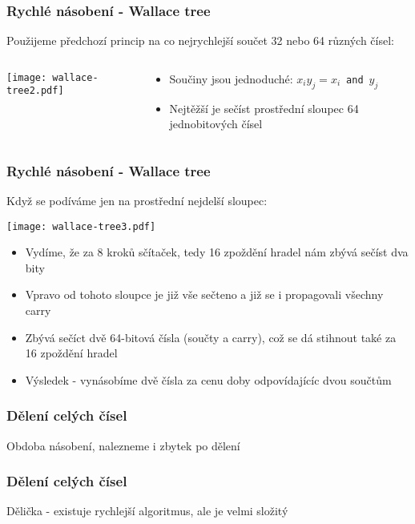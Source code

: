 \documentclass{beamer}
\begin{document}
\begin{frame}
\frametitle{Rychlé násobení - Wallace tree}

Použijeme předchozí princip na co nejrychlejší součet 32 nebo 64 různých čísel:
\begin{columns}
\begin{column}{0.6\textwidth}
\texttt{[image: wallace-tree2.pdf]}
\end{column}
\hfill
\begin{column}{0.4\textwidth}
\begin{itemize}
\item Součiny jsou jednoduché: $x_iy_j=x_i$~\texttt{and}~$y_j$
\item Nejtěžší je sečíst prostřední sloupec 64 jednobitových čísel
\end{itemize}
\end{column}
\end{columns}

\end{frame}

\begin{frame}[shrink=5]
\frametitle{Rychlé násobení - Wallace tree}

Když se podíváme jen na prostřední nejdelší sloupec:
\begin{center}
\texttt{[image: wallace-tree3.pdf]}
\end{center}

\begin{itemize}
\item Vydíme, že za 8 kroků sčítaček, tedy 16 zpoždění hradel nám zbývá sečíst dva bity
\item Vpravo od tohoto sloupce je již vše sečteno a již se i propagovali všechny carry
\item Zbývá sečíct dvě 64-bitová čísla (součty a carry), což se dá stihnout také za 16 zpoždění hradel
\item Výsledek - vynásobíme dvě čísla za cenu doby odpovídajícíc dvou součtům
\end{itemize}

\end{frame}


\begin{frame}
\frametitle{Dělení celých čísel}

Obdoba násobení, nalezneme i zbytek po dělení

\end{frame}


\begin{frame}
\frametitle{Dělení celých čísel}

Dělička - existuje rychlejší algoritmus, ale je velmi složitý

\end{frame}
\end{document}
